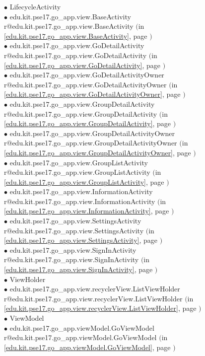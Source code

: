 \documentclass[11pt,a4paper]{article}
\makeatletter
\newcommand{\refdefined}[1]{
\expandafter\ifx\csname r@#1\endcsname\relax
\relax\else
{$($in \ref{#1}, page \pageref{#1}$)$}\fi}
\makeatother
\begin{document}
{{{{{{{{{{{{{{{{{{{{{{{{{{{{{{{{{{{{{{{{{{{{{{{{{{{{{{{{{{{{{{{{{{{{{{{{{{{\hspace{1.0cm} $\bullet$ LifecycleActivity {\tiny } \\
\hspace{2.0cm} $\bullet$ edu.kit.pse17.go_app.view.BaseActivity {\tiny \refdefined{edu.kit.pse17.go_app.view.BaseActivity}} \\
\hspace{3.0cm} $\bullet$ edu.kit.pse17.go_app.view.GoDetailActivity {\tiny \refdefined{edu.kit.pse17.go_app.view.GoDetailActivity}} \\
\hspace{4.0cm} $\bullet$ edu.kit.pse17.go_app.view.GoDetailActivityOwner {\tiny \refdefined{edu.kit.pse17.go_app.view.GoDetailActivityOwner}} \\
\hspace{3.0cm} $\bullet$ edu.kit.pse17.go_app.view.GroupDetailActivity {\tiny \refdefined{edu.kit.pse17.go_app.view.GroupDetailActivity}} \\
\hspace{4.0cm} $\bullet$ edu.kit.pse17.go_app.view.GroupDetailActivityOwner {\tiny \refdefined{edu.kit.pse17.go_app.view.GroupDetailActivityOwner}} \\
\hspace{3.0cm} $\bullet$ edu.kit.pse17.go_app.view.GroupListActivity {\tiny \refdefined{edu.kit.pse17.go_app.view.GroupListActivity}} \\
\hspace{3.0cm} $\bullet$ edu.kit.pse17.go_app.view.InformationActivity {\tiny \refdefined{edu.kit.pse17.go_app.view.InformationActivity}} \\
\hspace{3.0cm} $\bullet$ edu.kit.pse17.go_app.view.SettingsActivity {\tiny \refdefined{edu.kit.pse17.go_app.view.SettingsActivity}} \\
\hspace{3.0cm} $\bullet$ edu.kit.pse17.go_app.view.SignInActivity {\tiny \refdefined{edu.kit.pse17.go_app.view.SignInActivity}} \\
\hspace{1.0cm} $\bullet$ ViewHolder {\tiny } \\
\hspace{2.0cm} $\bullet$ edu.kit.pse17.go_app.view.recyclerView.ListViewHolder {\tiny \refdefined{edu.kit.pse17.go_app.view.recyclerView.ListViewHolder}} \\
\hspace{1.0cm} $\bullet$ ViewModel {\tiny } \\
\hspace{2.0cm} $\bullet$ edu.kit.pse17.go_app.viewModel.GoViewModel {\tiny \refdefined{edu.kit.pse17.go_app.viewModel.GoViewModel}} \\
}}}}}}}}}}}}}}}}}}}}}}}}}}}}}}}}}}}}}}}}}}}}}}}}}}}}}}}}}}}}}}}}}}}}}}}}}}}
\end{document}
